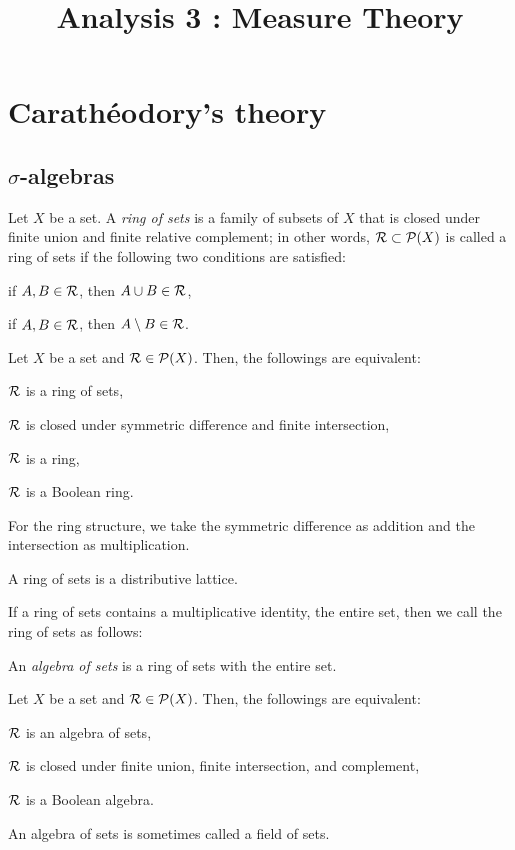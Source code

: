\documentclass{../crs}
\title{Analysis 3 : Measure Theory}
\begin{document}
\maketitle
\tableofcontents

\chapter{Carath\'eodory's theory}

\section{$\sigma$-algebras}
\begin{defn}
Let $X$ be a set.
A \emph{ring of sets} is a family of subsets of $X$ that is closed under finite union and finite relative complement; in other words, $\mathcal{R}\subset\mathcal{P}(X)$ is called a ring of sets if the following two conditions are satisfied:
\begin{cond}
\item if $A,B\in\mathcal{R}$, then $A\cup B\in\mathcal{R}$,
\item if $A,B\in\mathcal{R}$, then $A\setminus B\in\mathcal{R}$.
\end{cond}
\end{defn}

\begin{prop}
Let $X$ be a set and $\mathcal{R}\in\mathcal{P}(X)$.
Then, the followings are equivalent:
\begin{cond}
\item $\mathcal{R}$ is a ring of sets,
\item $\mathcal{R}$ is closed under symmetric difference and finite intersection,
\item $\mathcal{R}$ is a ring,
\item $\mathcal{R}$ is a Boolean ring.
\end{cond}
For the ring structure, we take the symmetric difference as addition and the intersection as multiplication.
\end{prop}

\begin{prop}
A ring of sets is a distributive lattice.
\end{prop}


If a ring of sets contains a multiplicative identity, the entire set, then we call the ring of sets as follows:
\begin{defn}
An \emph{algebra of sets} is a ring of sets with the entire set.
\end{defn}
\begin{prop}
Let $X$ be a set and $\mathcal{R}\in\mathcal{P}(X)$.
Then, the followings are equivalent:
\begin{cond}
\item $\mathcal{R}$ is an algebra of sets,
\item $\mathcal{R}$ is closed under finite union, finite intersection, and complement,
\item $\mathcal{R}$ is a Boolean algebra.
\end{cond}
\end{prop}
An algebra of sets is sometimes called a field of sets.
\end{document}
